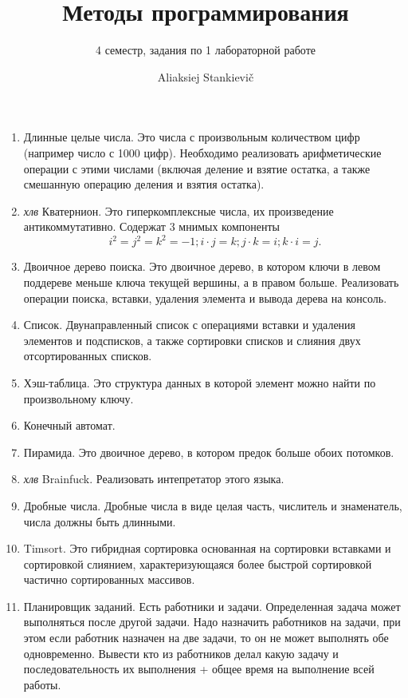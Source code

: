 \documentclass[12pt, oneside]{article}
\author{Aliaksiej Stankievič}
\title{Методы программирования}
\subtitle{4 семестр, задания по 1 лабораторной работе}
\begin{document}
 \maketitle
 \begin{enumerate}
  \item Длинные целые числа. Это числа с произвольным количеством цифр (например число с 1000 цифр). 
        Необходимо реализовать арифметические операции с этими числами (включая деление и взятие остатка, 
        а также смешанную операцию деления и взятия остатка).
  \item \textit{хлв} Кватернион. Это гиперкомплексные числа, их произведение антикоммутативно. Содержат 3 мнимых компоненты 
        \begin{equation}
         i^2=j^2=k^2=-1;
         i\cdot{}j=k;
         j\cdot{}k=i;
         k\cdot{}i=j.
        \end{equation}
  \item Двоичное дерево поиска. Это двоичное дерево, в котором ключи в левом поддереве меньше ключа текущей вершины, 
        а в правом больше. Реализовать операции поиска, вставки, удаления элемента и вывода дерева на консоль.
  \item Список. Двунаправленный список с операциями вставки и удаления элементов и подсписков, 
        а также сортировки списков и слияния двух отсортированных списков.
  \item Хэш-таблица. Это структура данных в которой элемент можно найти по произвольному ключу.
  \item Конечный автомат.
  \item Пирамида. Это двоичное дерево, в котором предок больше обоих потомков.
  \item \textit{хлв} Brainfuck. Реализовать интепретатор этого языка.
  \item Дробные числа. Дробные числа в виде целая часть, числитель и знаменатель, числа должны быть длинными.
  \item Timsort. Это гибридная сортировка основанная на сортировки вставками и сортировкой слиянием, характеризующаяся 
        более быстрой сортировкой частично сортированных массивов.
  \item Планировщик заданий. Есть работники и задачи. Определенная задача может выполняться после другой задачи. 
        Надо назначить работников на задачи, при этом если работник назначен на две задачи, то
        он не может выполнять обе одновременно. Вывести кто из работников делал какую
        задачу и последовательность их выполнения + общее время на выполнение всей работы.

\end{enumerate}
\end{document}

